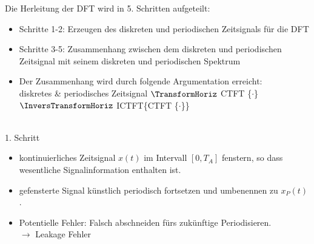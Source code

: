 \documentclass[12pt,a4paper]{scrartcl}
\begin{document}
 \noindent   Die Herleitung der DFT wird in 5. Schritten aufgeteilt: 
 \begin{itemize}
   \item Schritte 1-2: Erzeugen des diskreten und periodischen Zeitsignals für die DFT
   \item Schritte 3-5: Zusammenhang zwischen dem diskreten und periodischen Zeitsignal mit seinem diskreten und periodischen Spektrum 
   \item Der Zusammenhang wird durch folgende Argumentation erreicht: \\diskretes \& periodisches Zeitsignal $\TransformHoriz$ CTFT \{$\cdot$\} $\InversTransformHoriz$ ICTFT\{CTFT \{$\cdot$\}\}  
 \end{itemize}

 \noindent \\ 1. Schritt
 \begin{itemize}
   \item kontinuierliches Zeitsignal $x(t)$ im Intervall $[0, T_A]$ fenstern, so dass wesentliche Signalinformation enthalten ist.
   \item gefensterte Signal künstlich periodisch fortsetzen und umbenennen zu $x_P (t)$.
   \item Potentielle Fehler: Falsch abschneiden fürs zukünftige Periodisieren. \\$\to$ Leakage Fehler
 \end{itemize}
 
\end{document}
